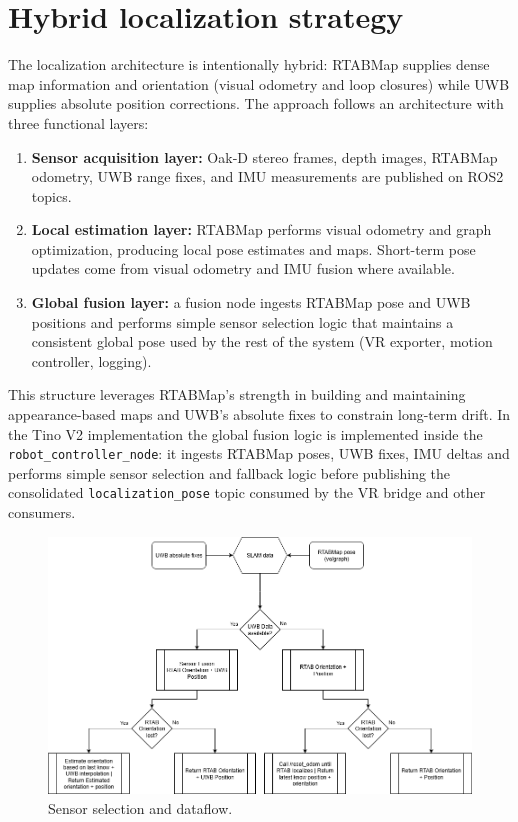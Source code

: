 \section{Hybrid localization strategy}

The localization architecture is intentionally hybrid: RTABMap supplies dense map information and orientation (visual odometry and loop closures) while UWB supplies absolute position corrections. The approach follows an architecture with three functional layers:

\begin{enumerate}
	\item \textbf{Sensor acquisition layer:} Oak‑D stereo frames, depth images, RTABMap odometry, UWB range fixes, and IMU measurements are published on ROS2 topics.
	\item \textbf{Local estimation layer:} RTABMap performs visual odometry and graph optimization, producing local pose estimates and maps. Short-term pose updates come from visual odometry and IMU fusion where available.
	\item \textbf{Global fusion layer:} a fusion node ingests RTABMap pose and UWB positions and performs simple sensor selection logic that maintains a consistent global pose used by the rest of the system (VR exporter, motion controller, logging).
\end{enumerate}

This structure leverages RTABMap's strength in building and maintaining appearance-based maps and UWB's absolute fixes to constrain long-term drift. In the Tino V2 implementation the global fusion logic is implemented inside the \texttt{robot\_controller\_node}: it ingests RTABMap poses, UWB fixes, IMU deltas and performs simple sensor selection and fallback logic before publishing the consolidated \texttt{localization\_pose} topic consumed by the VR bridge and other consumers.

\begin{figure}[H]
	\centering
	\includegraphics[width=0.85\linewidth]{Images/sensor_fusion.png}
	\caption{Sensor selection and dataflow.}\label{fig-sensor-fusion}
\end{figure}

